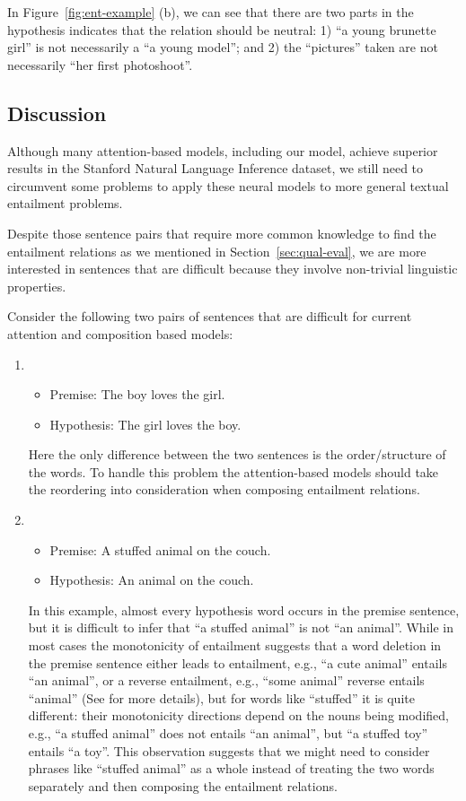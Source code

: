 In Figure~\ref{fig:ent-example} (b), we can see that
there are two parts in the hypothesis indicates that
the relation should be neutral: 1) ``a young brunette girl''
is not necessarily a ``a young model''; and 2)
the ``pictures'' taken are not necessarily ``her first photoshoot''.


\subsection{Discussion}
\label{sec:disc}

Although many attention-based
models, including our model, 
achieve superior 
results in the Stanford Natural Language Inference dataset,
we still need to circumvent some problems
to apply these neural models to more 
general textual entailment
problems.

Despite those sentence pairs that require
more common knowledge to find the entailment relations
as we mentioned in Section~\ref{sec:qual-eval},
we are more interested in sentences that are difficult
because they involve non-trivial linguistic properties.

Consider the following two pairs of sentences
that are difficult for current attention and composition based models:
\begin{enumerate}
\item \begin{itemize}
\item Premise: The boy loves the girl.
\item Hypothesis: The girl loves the boy.
\end{itemize}
Here the only difference between the two sentences
is the order/structure of the words. To handle this problem
the attention-based models should take the reordering
into consideration when composing entailment relations.
\item 
\begin{itemize}
\item Premise: A stuffed animal on the couch.
\item Hypothesis: An animal on the couch.
\end{itemize}
In this example, almost every hypothesis word occurs in the premise sentence,
but it is difficult to infer that ``a stuffed animal'' 
is not ``an animal''. While in most cases
the monotonicity of entailment suggests that
a word deletion in the premise sentence either leads
to entailment, e.g., ``a cute animal'' entails ``an animal'',
or a reverse entailment, e.g., ``some animal'' reverse entails
``animal'' (See  for more details),
but for words like ``stuffed'' it is quite different:
their monotonicity directions depend on the nouns being modified,
e.g.,
``a stuffed animal'' does not entails ``an animal'', but ``a stuffed toy'' entails ``a toy''.
This observation suggests that
we might need to consider phrases like ``stuffed animal'' as a whole 
instead of treating the two words separately and then 
composing  the entailment relations.
\end{enumerate}

